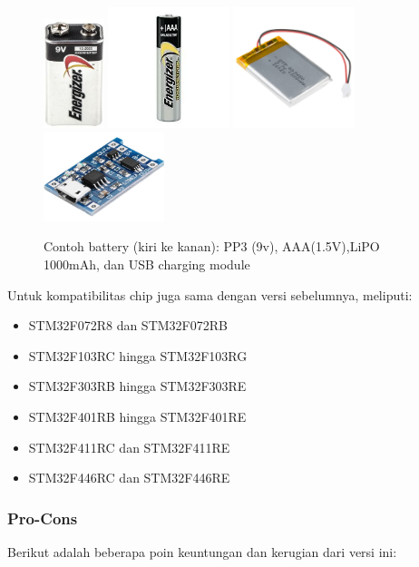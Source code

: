 \documentclass[12pt,]{article}
\begin{document}
	\begin{figure}[!ht]
		\centering
		\includegraphics[width=50pt]{images/batt_pp3}
		\includegraphics[width=100pt]{images/batt_aaa}
		\includegraphics[width=100pt]{images/batt_lipo}
		\includegraphics[width=100pt]{images/batt_tp4056}
		\caption{Contoh battery (kiri ke kanan): PP3 (9v), AAA(1.5V),LiPO 1000mAh, dan USB charging module}
	\end{figure}

	Untuk kompatibilitas chip juga sama dengan versi sebelumnya, meliputi:
	\begin{itemize}
		\item STM32F072R8 dan STM32F072RB
		\item STM32F103RC hingga STM32F103RG
		\item STM32F303RB hingga STM32F303RE
		\item STM32F401RB hingga STM32F401RE
		\item STM32F411RC dan STM32F411RE 
		\item STM32F446RC dan STM32F446RE
	\end{itemize}
	
	\newpage	
	\subsubsection{Pro-Cons}
	Berikut adalah beberapa poin keuntungan dan kerugian dari versi ini:\\
	
\end{document}
